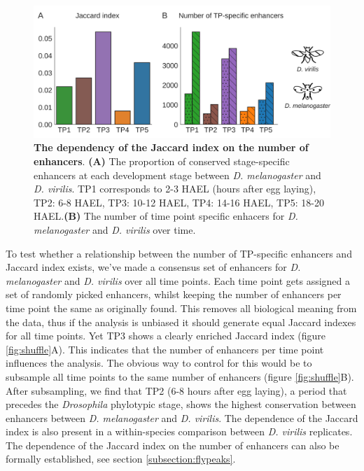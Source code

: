 \begin{figure}[H]
    \includegraphics[width=\linewidth]{ch.hourglass/images/enhancers_between.png}
    \caption{\textbf{The dependency of the Jaccard index on the number of enhancers}. \textbf{(A)} The proportion of conserved stage-specific enhancers at each development stage between \textit{D. melanogaster} and \textit{D. virilis}. TP1 corresponds to 2-3 HAEL (hours after egg laying), TP2: 6-8 HAEL, TP3: 10-12 HAEL, TP4: 14-16 HAEL, TP5: 18-20 HAEL.\textbf{(B)} The number of time point specific enhacers for \textit{D. melanogaster} and \textit{D. virilis} over time. }
    \label{fig:peak_between}
\end{figure}

To test whether a relationship between the number of TP-specific enhancers and Jaccard index exists, we've made a consensus set of enhancers for \textit{D. melanogaster} and \textit{D. virilis} over all time points. Each time point gets assigned a set of randomly picked enhancers, whilst keeping the number of enhancers per time point the same as originally found. This removes all biological meaning from the data, thus if the analysis is unbiased it should generate equal Jaccard indexes for all time points. Yet TP3 shows a clearly enriched Jaccard index (figure \ref{fig:shuffle}A). This indicates that the number of enhancers per time point influences the analysis. The obvious way to control for this would be to subsample all time points to the same number of enhancers (figure \ref{fig:shuffle}B). After subsampling, we find that TP2 (6-8 hours after egg laying), a period that precedes the \textit{Drosophila} phylotypic stage\cite{Kalinka2010,Liu2020}, shows the highest conservation between enhancers between \textit{D. melanogaster} and \textit{D. virilis}. The dependence of the Jaccard index is also present in a within-species comparison between \textit{D. virilis} replicates. The dependence of the Jaccard index on the number of enhancers can also be formally established, see section \ref{subsection:flypeaks}.

